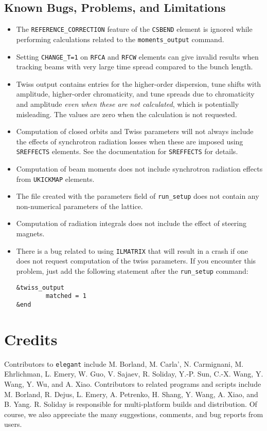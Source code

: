 \documentclass[11pt]{article}
\begin{document}
\subsection{Known Bugs, Problems, and Limitations}
\begin{itemize}
\item The \verb|REFERENCE_CORRECTION| feature of the \verb|CSBEND| element is ignored while performing calculations related
  to the \verb|moments_output| command.
\item Setting \verb|CHANGE_T=1| on \verb|RFCA| and \verb|RFCW| elements can give invalid results when tracking beams with very 
  large time spread compared to the bunch length.
\item Twiss output contains entries for the higher-order dispersion, tune shifts with amplitude, higher-order chromaticity, and tune spreads
  due to chromaticity and amplitude {\em even when these are not calculated}, which is potentially
  misleading.   The values are zero when the calculation is not requested.
\item Computation of closed orbits and Twiss parameters will not always include the effects of synchrotron
  radiation losses when these are imposed using {\tt SREFFECTS} elements.  See
  the documentation for {\tt SREFFECTS} for details.
\item Computation of beam moments does not include synchrotron radiation effects from \verb|UKICKMAP| elements.
\item The file created with the parameters field of \verb|run_setup| does not contain
  any non-numerical parameters of the lattice.
\item Computation of radiation integrals does not include the effect of steering magnets.
\item There is a bug related to using {\tt ILMATRIX} that will result in a crash
  if one does not request computation of the twiss parameters. If you encounter this
  problem, just add the following statement after the \verb|run_setup| command:
\begin{verbatim}
&twiss_output
        matched = 1
&end
\end{verbatim}
\end{itemize}

\section{Credits}

Contributors to {\tt elegant} include M. Borland, M. Carla', N. Carmignani, M. Ehrlichman, L. Emery, W. Guo, V. Sajaev, R. Soliday, Y.-P. Sun, C.-X. Wang, Y. Wang, Y. Wu, and A. Xiao.
Contributors to related programs and scripts include M. Borland, R. Dejus, L. Emery, A. Petrenko, H. Shang, Y. Wang, 
A. Xiao, and B. Yang.
R. Soliday is responsible for multi-platform builds and distribution.
Of course, we also appreciate the many suggestions, comments, and bug reports from users.
\end{document}
